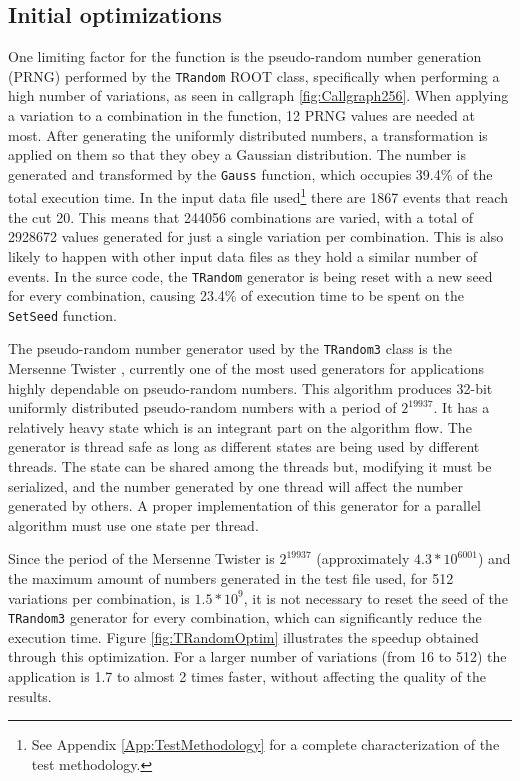\subsection{Initial optimizations}
\label{InitialOptimizations}

One limiting factor for the \ttDilepKinFit function is the pseudo-random number generation (PRNG) performed by the \texttt{TRandom} ROOT class, specifically when performing a high number of variations, as seen in callgraph \ref{fig:Callgraph256}. When applying a variation to a combination in the \ttDilepKinFit function, 12 PRNG values are needed at most. After generating the uniformly distributed numbers, a transformation is applied on them so that they obey a Gaussian distribution. The number is generated and transformed by the \texttt{Gauss} function, which occupies 39.4\% of the total execution time. In the input data file used\footnote{See Appendix \ref{App:TestMethodology} for a complete characterization of the test methodology.} there are 1867 events that reach the cut 20. This means that 244056 combinations are varied, with a total of 2928672 values generated for just a single variation per combination. This is also likely to happen with other input data files as they hold a similar number of events. In the \ttDilepKinFit surce code, the \texttt{TRandom} generator is being reset with a new seed for every combination, causing 23.4\% of execution time to be spent on the \texttt{SetSeed} function.

The pseudo-random number generator used by the \texttt{TRandom3} class is the Mersenne Twister \cite{MersenneTwister}, currently one of the most used generators for applications highly dependable on pseudo-random numbers. This algorithm produces 32-bit uniformly distributed pseudo-random numbers with a period of $2^{19937}$. It has a relatively heavy state which is an integrant part on the algorithm flow. The generator is thread safe as long as different states are being used by different threads. The state can be shared among the threads but, modifying it must be serialized, and the number generated by one thread will affect the number generated by others. A proper implementation of this generator for a parallel algorithm must use one state per thread.

Since the period of the Mersenne Twister is $2^{19937}$ (approximately $4.3 * 10^{6001}$) and the maximum amount of numbers generated in the test file used, for 512 variations per combination, is $1.5 * 10^{9}$, it is not necessary to reset the seed of the \texttt{TRandom3} generator for every combination, which can significantly reduce the \ttDilepKinFit execution time. Figure \ref{fig:TRandomOptim} illustrates the speedup obtained through this optimization. For a larger number of variations (from 16 to 512) the application is 1.7 to almost 2 times faster, without affecting the quality of the results.

